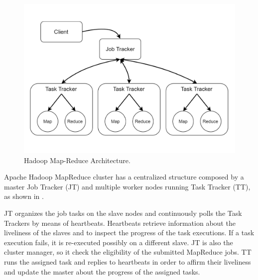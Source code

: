 
\begin{figure}
	\vspace{-1cm}
	\centering
	\includegraphics[width=\columnwidth]{Images/hadoop_map_reduce_architecture.pdf}  
	\vspace{-1cm}
	\caption[hadoop map-reduce architecture]{Hadoop Map-Reduce Architecture.}
	\label{fig:hadoopMapReduceArchitecture}
\end{figure}

Apache Hadoop MapReduce cluster has a centralized structure composed by a master Job Tracker (JT) and multiple worker nodes running Task Tracker (TT), as shown in  . 

JT organizes the job tasks on the slave nodes and continuously polls the Task Trackers by means of heartbeats. Heartbeats retrieve information about the liveliness of the slaves and to inspect the progress of the task  executions. If a task execution fails, it is re-executed possibly on a different slave. JT is also the cluster manager, so it check the eligibility of the submitted MapReduce jobs. TT runs the assigned task and replies to heartbeats in order to affirm their liveliness and update the master about the progress of the assigned tasks. %

